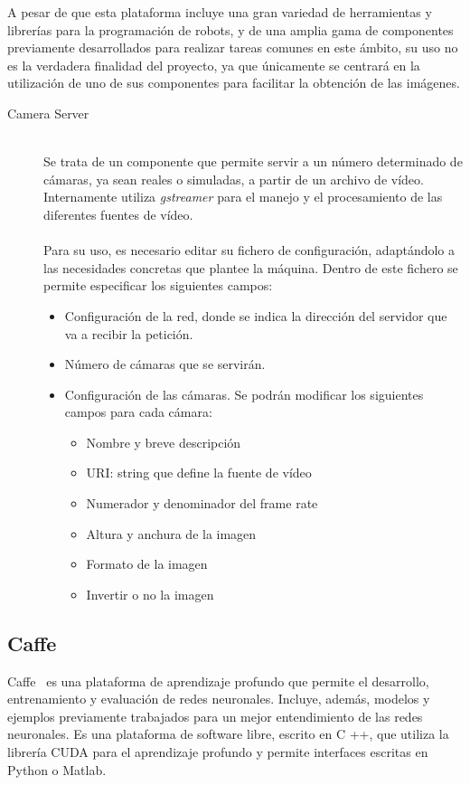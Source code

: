 A pesar de que esta plataforma incluye una gran variedad de herramientas y librerías para la programación de robots, y de una amplia gama de componentes previamente desarrollados para realizar tareas comunes en este ámbito, su uso no es la verdadera finalidad del proyecto, ya que únicamente se centrará en la utilización de uno de sus componentes para facilitar la obtención de las imágenes.
\vspace{10pt}
\begin{description}
\item[Camera Server] \hfill 
\vspace{10pt}
\\
Se trata de un componente que permite servir a un número determinado de cámaras, ya sean reales o simuladas, a partir de un archivo de vídeo. Internamente utiliza \textit{gstreamer} para el manejo y el procesamiento de las diferentes fuentes de vídeo.\\
\vspace{-10pt}
\\
Para su uso, es necesario editar su fichero de configuración, adaptándolo a las necesidades concretas que plantee la máquina. Dentro de este fichero se permite especificar los siguientes campos:\\
\vspace{-20pt}
\begin{itemize}
    \item Configuración de la red, donde se indica la dirección del servidor que va a recibir la petición.
    \item Número de cámaras que se servirán.
    \item Configuración de las cámaras. Se podrán modificar los siguientes campos para cada cámara:
    \begin{itemize}
         \item Nombre y breve descripción
         \item URI: string que define la fuente de vídeo
     	 \item Numerador y denominador del frame rate
         \item Altura y anchura de la imagen
         \item Formato de la imagen
         \item Invertir o no la imagen 
    \end{itemize}
\end{itemize}
\end{description}

\subsection{Caffe}\label{sec.caffe}
Caffe~\cite{jia2014caffe} es una plataforma de aprendizaje profundo que permite el desarrollo, entrenamiento y evaluación de redes neuronales. Incluye, además, modelos y ejemplos previamente trabajados para un mejor entendimiento de las redes neuronales. Es una plataforma de software libre, escrito en C ++, que utiliza la librería CUDA para el aprendizaje profundo y permite interfaces escritas en Python o Matlab.\\ 

